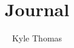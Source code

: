 \documentclass[aps,twocolumn,nobalancelastpage]{revtex4-1}
\begin{document}
\begin{abstract}
\lstset{basicstyle=\ttfamily,mathescape=true}

\end{abstract}%
\author{Kyle Thomas}\title{Journal}
\maketitle

\end{document}
